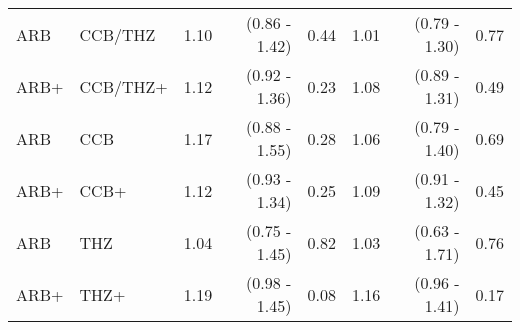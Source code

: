 \documentclass[11pt,]{article}
\begin{document}
\begin{table}[H]
{\begin{tabular}{llrrrrrr}
  ARB & CCB/THZ & 1.10 & (0.86 - 1.42) & 0.44 & 1.01 & (0.79 - 1.30) & 0.77 \\ 
  ARB+ & CCB/THZ+ & 1.12 & (0.92 - 1.36) & 0.23 & 1.08 & (0.89 - 1.31) & 0.49 \\ 
  ARB & CCB & 1.17 & (0.88 - 1.55) & 0.28 & 1.06 & (0.79 - 1.40) & 0.69 \\ 
  ARB+ & CCB+ & 1.12 & (0.93 - 1.34) & 0.25 & 1.09 & (0.91 - 1.32) & 0.45 \\ 
  ARB & THZ & 1.04 & (0.75 - 1.45) & 0.82 & 1.03 & (0.63 - 1.71) & 0.76 \\ 
  ARB+ & THZ+ & 1.19 & (0.98 - 1.45) & 0.08 & 1.16 & (0.96 - 1.41) & 0.17 \\ 
    \bottomrule
  \end{tabular}
  }
\end{table}
\begin{table}[H]
 \caption{Risk estimates for COVID-19 hospitalization across propensity score stratifed, prevalent-user cohorts in the SIDIAP data source. We report uncalibrated and calibrated hazard ratios (HRs) and their 95\% confidence intervals (CIs). (+) indicates in-combination cohorts.}
\end{table}
\end{document}
